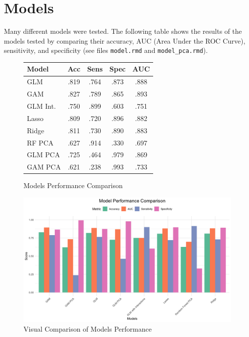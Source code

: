 \section{Models}
Many different models were tested. The following table shows the results of the models tested by comparing their accuracy, AUC (Area Under the ROC Curve), sensitivity, and specificity (see files \texttt{model.rmd} and \texttt{model\_pca.rmd}).
\begin{figure}[H]
    \centering
    \begin{minipage}{0.48\textwidth}
        \centering
        \small
        \setlength{\tabcolsep}{4pt}
        \begin{tabular}{|l|c|c|c|c|}
            \hline
            \textbf{Model} & \textbf{Acc} & \textbf{Sens} & \textbf{Spec} & \textbf{AUC} \\ \hline
            GLM & .819 & .764 & .873 & .888 \\ \hline
            GAM & .827 & .789 & .865 & .893 \\ \hline
            GLM Int. & .750 & .899 & .603 & .751 \\ \hline
            Lasso & .809 & .720 & .896 & .882 \\ \hline
            Ridge & .811 & .730 & .890 & .883 \\ \hline
            RF PCA & .627 & .914 & .330 & .697 \\ \hline
            GLM PCA & .725 & .464 & .979 & .869 \\ \hline
            GAM PCA & .621 & .238 & .993 & .733 \\ \hline
        \end{tabular}
        \caption{Models Performance Comparison}
        \label{tab:model_comparison}
    \end{minipage}
    \hfill
    \begin{minipage}{0.48\textwidth}
        \centering
        \includegraphics[width=\textwidth]{Immagini/model_comp.png}
        \caption{Visual Comparison of Models Performance}
        \label{fig:models_performance}
    \end{minipage}
\end{figure}

